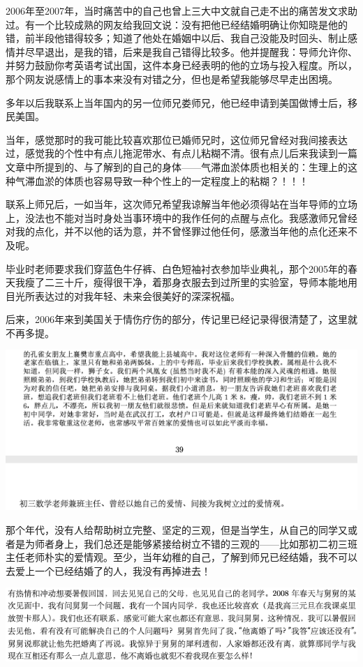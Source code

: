\documentclass[9pt, b5paper]{article}
\begin{document}
2006年至2007年，当时痛苦中的自己也曾上三大中文就自己走不出的痛苦发文求助过。有一个比较成熟的网友给我回文说：没有把他已经结婚明确让你知晓是他的错，前半段他错得较多；知道了他处在婚姻中以后、我自己没能及时回头、制止感情并尽早退出，是我的错，后来是我自己错得比较多。他并提醒我：导师允许你、并努力鼓励你考英语考试出国，这件本身已经表明的他的立场与投入程度。所以，那个网友说感情上的事本来没有对错之分，但也是希望我能够尽早走出困境。

多年以后我联系上当年国内的另一位师兄娄师兄，他已经申请到美国做博士后，移民美国。

当年，感觉那时的我可能比较喜欢那位已婚师兄时，这位师兄曾经对我间接表达过，感觉我的个性中有点儿拖泥带水、有点儿粘糊不清。很有点儿后来我读到一篇文章中所提到的、与了解到的自己的身体——气滞血淤体质也相关的：生理上的这种气滞血淤的体质也容易导致一种个性上的一定程度上的粘糊？！！！

联系上师兄后，一如当年，这次师兄希望我谅解当年他必须得站在当年导师的立场上，没法也不能对当时身处当事环境中的我作任何的点醒与点化。我感激师兄曾经对我的点化，并不以他的话为意，并不曾怪罪过他任何，感激当年他的点化还来不及呢。

毕业时老师要求我们穿蓝色牛仔裤、白色短袖衬衣参加毕业典礼，那个2005年的春天我瘦了二三十斤，瘦得很干净，着那身衣服去到过所里的实验室，导师本能地用目光所表达过的对我年轻、未来会很美好的深深祝福。

后来，2006年来到美国关于情伤疗伤的部分，传记里已经记录得很清楚了，这里就不再多提。

\begin{center}
\includegraphics[width=.9\linewidth]{./pic/backups_plans_20210503_133325.png}
\end{center}

那个年代，没有人给帮助树立完整、坚定的三观，但是当学生，从自己的同学又或者是为师者身上，我们总还是能够紧接给树立不错的三观的——比如那初二初三班主任老师朴实的爱情观。至少，当年幼稚的自己，了解到师兄已经结婚，我不可以去爱上一个已经结婚了的人，我没有再掉进去！

\begin{center}
\includegraphics[width=.9\linewidth]{./pic/backups_plans_20210503_133503.png}
\end{center}
\end{document}
